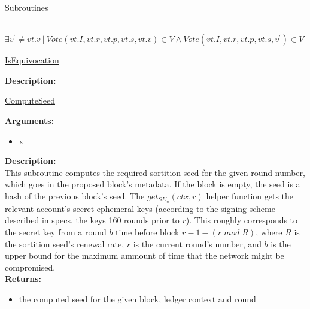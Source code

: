 \documentclass[10pt,a4paper]{article}
\begin{document}
\begin{section}{Subroutines}
\begin{algorithm}[H]
\begin{algorithmic}[1]
    \Return \ $\exists v^\prime \neq vt.v \ | \ Vote(vt.I, vt.r, vt.p, vt.s, vt.v) \in V \land 
    Vote(vt.I, vt.r, vt.p, vt.s, v^\prime) \in V$

    \EndFunction
    \end{algorithmic}
    \caption{\underline{IsEquivocation}}
\end{algorithm}

\noindent \textbf{Description:}\\


\begin{algorithm}[H]
    \begin{algorithmic}[1]


    \EndFunction
    \end{algorithmic}
    \caption{\underline{ComputeSeed}}
\end{algorithm}


\noindent \textbf{Arguments:}
\begin{itemize}
    \item x
  \end{itemize}


\noindent \textbf{Description:}\\
This subroutine computes the required sortition seed for the given round number, 
which goes in the proposed block's metadata.
If the block is empty, the seed is a hash of the previous block's seed.
The $get_{SK_a}(ctx, r)$ helper function gets the relevant account's secret ephemeral keys (according to the signing scheme described in specs, the keys 160 rounds prior to $r$).
This roughly corresponds to the secret key from a round $b$ time before block $r-1-(r\;mod\;R)$, where $R$ is the sortition seed's renewal rate, $r$ is the current round's number,
and $b$ is the upper bound for the maximum ammount of time that the network might be compromised.\\

\noindent \textbf{Returns:}
\begin{itemize}
    \item the computed seed for the given block, ledger context and round
  \end{itemize}



\end{section}
\end{document}
